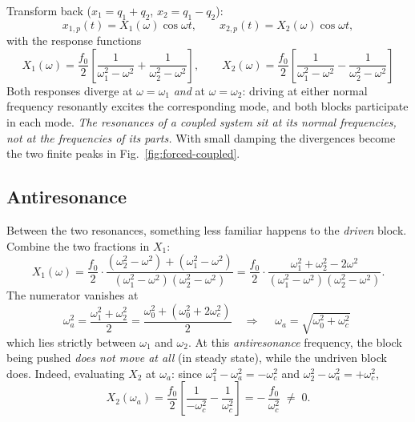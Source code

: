 \documentclass[11pt]{article}
\theoremstyle{plain}
\theoremstyle{definition}
\theoremstyle{remark}
\begin{document}
Transform back ($x_1 = q_1+q_2$, $x_2 = q_1 - q_2$):
\begin{equation}
  x_{1,p}(t) = X_1(\omega)\cos\omega t,
  \qquad
  x_{2,p}(t) = X_2(\omega)\cos\omega t,
\end{equation}
with the response functions
\begin{equation}
  \boxed{\;
  X_1(\omega) = \frac{f_0}{2}\left[
    \frac{1}{\omega_1^2-\omega^2} + \frac{1}{\omega_2^2-\omega^2}\right],
  \qquad
  X_2(\omega) = \frac{f_0}{2}\left[
    \frac{1}{\omega_1^2-\omega^2} - \frac{1}{\omega_2^2-\omega^2}\right]
  \;}
  \label{eq:X1X2}
\end{equation}
Both responses diverge at $\omega = \omega_1$ \emph{and} at
$\omega=\omega_2$: driving at either normal frequency resonantly excites the
corresponding mode, and both blocks participate in each mode. \emph{The
resonances of a coupled system sit at its normal frequencies, not at the
frequencies of its parts.} With small damping the divergences become the two
finite peaks in Fig.~\ref{fig:forced-coupled}.

\subsection{Antiresonance}
\label{sec:antiresonance}

Between the two resonances, something less familiar happens to the
\emph{driven} block. Combine the two fractions in $X_1$:
\begin{equation}
  X_1(\omega)
  = \frac{f_0}{2}\cdot
  \frac{(\omega_2^2 - \omega^2) + (\omega_1^2 - \omega^2)}
       {(\omega_1^2-\omega^2)(\omega_2^2-\omega^2)}
  = \frac{f_0}{2}\cdot
  \frac{\omega_1^2 + \omega_2^2 - 2\omega^2}
       {(\omega_1^2-\omega^2)(\omega_2^2-\omega^2)} .
\end{equation}
The numerator vanishes at
\begin{equation}
  \omega_a^2 = \frac{\omega_1^2 + \omega_2^2}{2}
  = \frac{\omega_0^2 + (\omega_0^2 + 2\omega_c^2)}{2}
  \quad\Longrightarrow\quad
  \boxed{\;
  \omega_a = \sqrt{\omega_0^2 + \omega_c^2}
  \;}
\end{equation}
which lies strictly between $\omega_1$ and $\omega_2$. At this
\emph{antiresonance} frequency, the block being pushed \emph{does not move at
all} (in steady state), while the undriven block does. Indeed, evaluating
$X_2$ at $\omega_a$: since
$\omega_1^2 - \omega_a^2 = -\omega_c^2$ and
$\omega_2^2 - \omega_a^2 = +\omega_c^2$,
\begin{equation}
  X_2(\omega_a)
  = \frac{f_0}{2}\left[\frac{1}{-\omega_c^2} - \frac{1}{\omega_c^2}\right]
  = -\,\frac{f_0}{\omega_c^2} \;\neq\; 0 .
\end{equation}
\end{document}
